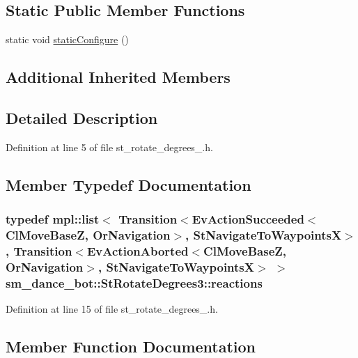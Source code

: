 \subsection*{Static Public Member Functions}
\begin{DoxyCompactItemize}
\item 
static void \hyperlink{structsm__dance__bot_1_1StRotateDegrees3_a8156b512fa51ed1be24f5099ee9481be}{static\+Configure} ()
\end{DoxyCompactItemize}
\subsection*{Additional Inherited Members}


\subsection{Detailed Description}


Definition at line 5 of file st\+\_\+rotate\+\_\+degrees\+\_.\+h.



\subsection{Member Typedef Documentation}
\subsubsection[{\texorpdfstring{reactions}{reactions}}]{\setlength{\rightskip}{0pt plus 5cm}typedef mpl\+::list$<$ Transition$<$Ev\+Action\+Succeeded$<${\bf Cl\+Move\+BaseZ}, {\bf Or\+Navigation}$>$, {\bf St\+Navigate\+To\+WaypointsX}$>$, Transition$<$Ev\+Action\+Aborted$<${\bf Cl\+Move\+BaseZ}, {\bf Or\+Navigation}$>$, {\bf St\+Navigate\+To\+WaypointsX}$>$ $>$ {\bf sm\+\_\+dance\+\_\+bot\+::\+St\+Rotate\+Degrees3\+::reactions}}\hypertarget{structsm__dance__bot_1_1StRotateDegrees3_afbfb018473d5a16b0b111b3b626aca6b}{}\label{structsm__dance__bot_1_1StRotateDegrees3_afbfb018473d5a16b0b111b3b626aca6b}


Definition at line 15 of file st\+\_\+rotate\+\_\+degrees\+\_.\+h.



\subsection{Member Function Documentation}
